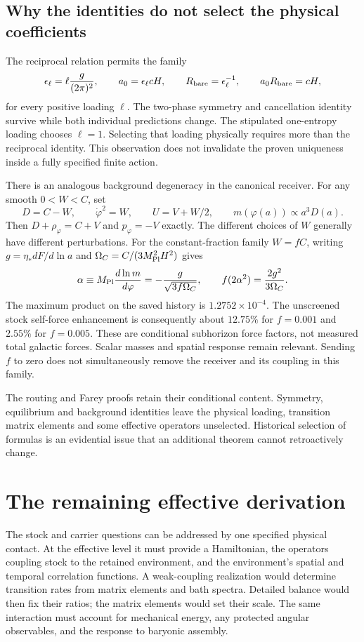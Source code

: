 \documentclass[11pt]{article}
\begin{document}
\subsection{Why the identities do not select the physical coefficients}
The reciprocal relation permits the family
\begin{equation}
 \epsilon_\ell=\ell\frac{g}{(2\pi)^2},\qquad
 a_0=\epsilon_\ell cH,\qquad
 R_{\rm bare}=\epsilon_\ell^{-1},\qquad
 a_0R_{\rm bare}=cH,
\end{equation}
for every positive loading $\ell$. The two-phase symmetry and cancellation
identity survive while both individual predictions change. The stipulated
one-entropy loading chooses $\ell=1$. Selecting that loading physically
requires more than the reciprocal identity. This observation does not
invalidate the proven uniqueness inside a fully specified finite action.

There is an analogous background degeneracy in the canonical receiver.
For any smooth $0<W<C$, set
\begin{equation}
 D=C-W,\qquad \dot\varphi^2=W,\qquad U=V+W/2,
 \qquad m(\varphi(a))\propto a^3D(a).
\end{equation}
Then $D+\rho_\varphi=C+V$ and $p_\varphi=-V$ exactly.
The different choices of $W$ generally have different perturbations.
For the constant-fraction family $W=fC$, writing
$g=\eta_*dF/d\ln a$ and $\Omega_C=C/(3M_{\rm Pl}^2H^2)$ gives
\begin{equation}
 \alpha\equiv M_{\rm Pl}\frac{d\ln m}{d\varphi}
 =-\frac{g}{\sqrt{3f\Omega_C}},\qquad
 f(2\alpha^2)=\frac{2g^2}{3\Omega_C}.
\end{equation}
The maximum product on the saved history is $1.2752\times10^{-4}$.
The unscreened stock self-force enhancement is consequently about $12.75\%$
for $f=0.001$ and $2.55\%$ for $f=0.005$. These are conditional subhorizon
force factors, not measured total galactic forces. Scalar masses and spatial
response remain relevant. Sending $f$ to zero does not simultaneously remove
the receiver and its coupling in this family.

The routing and Farey proofs retain their conditional content. Symmetry,
equilibrium and background identities leave the physical loading, transition
matrix elements and some effective operators unselected. Historical
selection of formulas is an evidential issue that an additional theorem
cannot retroactively change.

\section{The remaining effective derivation}
The stock and carrier questions can be addressed by one specified physical
contact. At the effective level it must provide a Hamiltonian, the operators
coupling stock to the retained environment, and the environment's spatial and
temporal correlation functions. A weak-coupling realization would determine
transition rates from matrix elements and bath spectra. Detailed balance
would then fix their ratios; the matrix elements would set their scale.
The same interaction must account for mechanical energy, any protected
angular observables, and the response to baryonic assembly.
\end{document}
